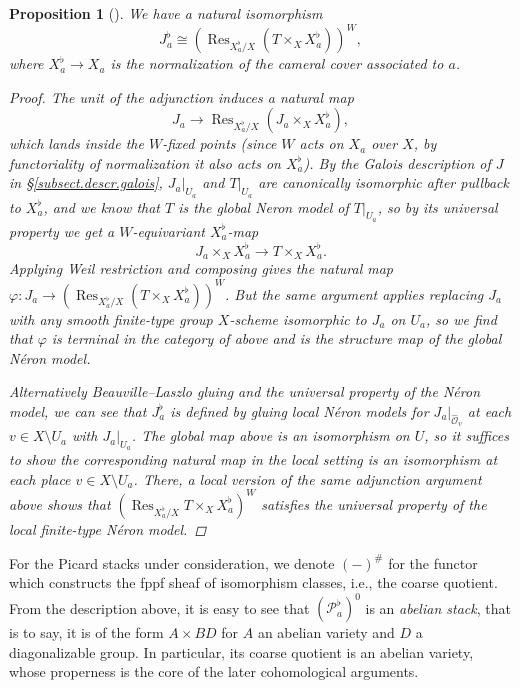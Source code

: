 \documentclass[openany]{amsbook}
\newtheorem{proposition}[theorem]{Proposition}
\theoremstyle{definition}
\theoremstyle{remark}
\numberwithin{equation}{section}
\renewcommand{\O}{\mathcal{O}}
\newcommand{\cP}{\mathcal{P}}
\renewcommand{\-}{\operatorname{-}}
\newcommand{\on}[1]{\operatorname{#1}}
\newcommand{\Res}{\on{Res}}
\begin{document}
\begin{proposition}[{{\cite[Corollaire 4.8.1]{ngofl}}}]\label{prop.Jflat.Weil.res.description}
    We have a natural isomorphism
    $$
        J_a^\flat \cong (\Res_{X_a^{\flat}/X} (T \times_X X_a^{\flat}))^W,
    $$
    where $X_a^{\flat} \to X_a$ is the normalization of the cameral cover associated to $a$.
    \begin{proof}
        The unit of the adjunction induces a natural map 
        $$J_a \to \Res_{X_a^{\flat}/X} (J_a \times_X X_a^{\flat}),$$ 
        which lands inside the $W$-fixed points (since $W$ acts on $X_a$ over $X$, by functoriality of normalization it also acts on $X_a^{\flat}$). By the Galois description of $J$ in \S \ref{subsect.descr.galois}, $J_a|_{U_a}$ and $T|_{U_a}$ are canonically isomorphic after pullback to $X_a^{\flat}$, and we know that $T$ is the global Neron model of $T|_{U_a}$, so by its universal property we get a $W$-equivariant $X_a^{\flat}$-map
        $$
            J_a \times_X X_a^{\flat} \to T \times_X X_a^{\flat}.
        $$
        Applying Weil restriction and composing gives the natural map $\varphi: J_a \to (\Res_{X_a^{\flat}/X} (T \times_X X_a^{\flat}))^W$. But the same argument applies replacing $J_a$ with any smooth finite-type group $X$-scheme isomorphic to $J_a$ on $U_a$, so we find that $\varphi$ is terminal in the category of above and is the structure map of the global N\'eron model. 
        
        Alternatively Beauville--Laszlo gluing and the universal property of the N\'eron model, we can see that $J_a^{\flat}$ is defined by gluing local N\'eron models for $J_{a}|_{\widehat{\O}_{v}}$ at each $v \in X \setminus U_a$ with $J_a|_{U_a}$. The global map above is an isomorphism on $U$, so it suffices to show the corresponding natural map in the local setting is an isomorphism at each place $v \in X \setminus U_a$. There, a local version of the same adjunction argument above shows that $(\Res_{X_a^{\flat}/X} T \times_X X_a^{\flat})^W$ satisfies the universal property of the local finite-type N\'eron model.
    \end{proof}
\end{proposition}

For the Picard stacks under consideration, we denote $(-)^{\#}$ for the functor which constructs the fppf sheaf of isomorphism classes, i.e., the coarse quotient. From the description above, it is easy to see that $(\cP_a^{\flat})^0$ is an \textit{abelian stack}, that is to say, it is of the form $A \times BD$ for $A$ an abelian variety and $D$ a diagonalizable group. In particular, its coarse quotient is an abelian variety, whose properness is the core of the later cohomological arguments.
\end{document}
